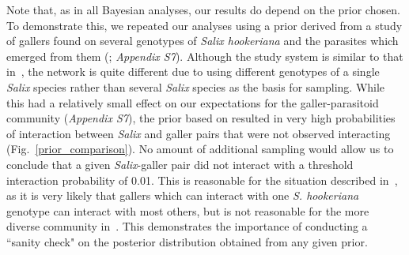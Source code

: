 \documentclass[12pt]{article}
\begin{document}
\begin{spacing}{1.5}
  Note that, as in all Bayesian analyses, our results do depend on the prior chosen. To demonstrate this, we repeated our analyses using a prior derived from a study of gallers found on several genotypes of \emph{Salix hookeriana} and the parasites which emerged from them (\citealp{Barbour2016,Barbour2016Dryad}; \emph{Appendix S7}). Although the study system is similar to that in~\citet{Kopelke2017}, the network is quite different due to using different genotypes of a single \emph{Salix} species rather than several \emph{Salix} species as the basis for sampling. While this had a relatively small effect on our expectations for the galler-parasitoid community (\emph{Appendix S7}), the prior based on \citep{Barbour2016} resulted in very high probabilities of interaction between \emph{Salix} and galler pairs that were not observed interacting (Fig.~\ref{prior_comparison}). No amount of additional sampling would allow us to conclude that a given \emph{Salix}-galler pair did not interact with a threshold interaction probability of 0.01. This is reasonable for the situation described in~\citet{Barbour2016}, as it is very likely that gallers which can interact with one \emph{S. hookeriana} genotype can interact with most others, but is not reasonable for the more diverse community in~\citet{Kopelke2017}. This demonstrates the importance of conducting a ``sanity check" on the posterior distribution obtained from any given prior.





\end{spacing}
\end{document}
